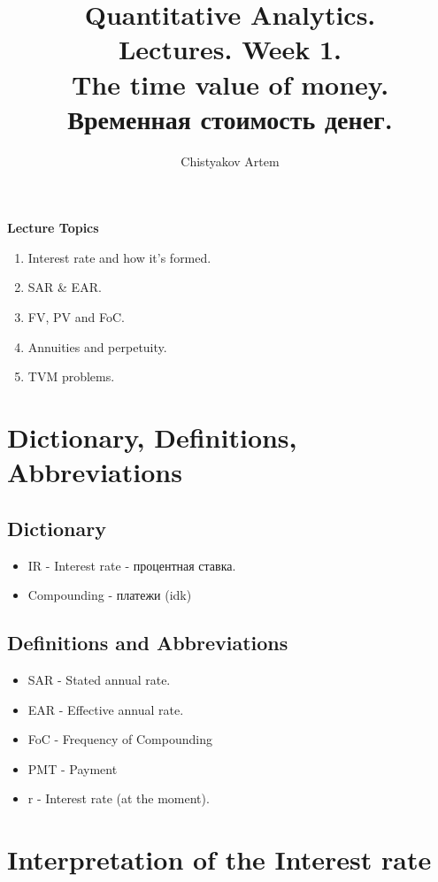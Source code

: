 \documentclass{article}
\title{Quantitative Analytics.\\
Lectures. Week 1. \\
The time value of money. Временная стоимость денег.}
\author{Chistyakov Artem}
\begin{document}
\maketitle

\textbf{
Lecture Topics
}

\begin{enumerate}
\item Interest rate and how it's formed.
\item SAR \& EAR.
\item FV, PV and FoC.
\item Annuities and perpetuity.
\item TVM problems.
\end{enumerate}



\section{Dictionary, Definitions, Abbreviations}

\subsection{Dictionary}
\begin{itemize}
    \item IR - Interest rate - процентная ставка.
    \item Compounding - платежи (idk)
\end{itemize}

\subsection{Definitions and Abbreviations}
\begin{itemize}
    \item SAR - Stated annual rate.
    \item EAR - Effective annual rate.
    \item FoC - Frequency of Compounding
    \item PMT - Payment
    \item r - Interest rate (at the moment). 
\end{itemize}


\section{Interpretation of the Interest rate}
\end{document}
